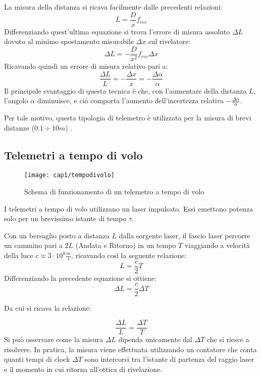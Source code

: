 La misura della distanza si ricava facilmente dalle precedenti relazioni:
\begin{equation}
  L=\frac{D}{x}f_{rec}
\end{equation}
Differenziando quest'ultima equazione si trova l'errore di misura assoluto $\Delta L$ dovuto al minimo spostamento misurabile $\Delta x$ sul rivelatore: 
\begin{equation}
	 \Delta L=-\frac{D}{x^2}f_{rec}\Delta x
\end{equation}
Ricavando quindi un errore di misura relativo pari a:
\begin{equation}
\frac{\Delta L}{L}=-\frac{\Delta x}{x}=-\frac{\Delta\alpha}{\alpha}
\end{equation}
Il principale svantaggio di questa tecnica è che, con l'aumentare della distanza $L$, l'angolo $\alpha$ diminuisce, e ciò comporta l'aumento dell'incertezza relativa $-\frac{\Delta\alpha}{\alpha}$.
 
Per tale motivo, questa tipologia di telemetro è utilizzata per la misura di brevi distanze ($0.1\div 10 m$) .

\subsection{Telemetri a tempo di volo}
\begin{figure}[H]
	\begin{center}
		\texttt{[image: cap1/tempodivolo]}
		\caption{Schema di funzionamento di un telemetro a tempo di volo}
		\label{tempodivolo}
	\end{center}
\end{figure}
I telemetri a tempo di volo utilizzano un laser impulsato. Essi emettono potenza solo per un brevissimo istante di tempo $\tau$.

Con un bersaglio posto a distanza $L$ dalla sorgente laser, il fascio laser percorre un cammino pari a $2L$ (Andata e Ritorno) in un tempo $T$ viaggiando a velocità della luce $c\approx3\cdot10^8\frac{m}{s}$, ricavando così la seguente relazione:
\begin{equation}
  L=\frac{c}{2}T
\end{equation}
Differenziando la precedente equazione si ottiene:
\begin{equation}
  \Delta L=\frac{c}{2}\Delta T
\end{equation}

Da cui si ricava la relazione:

\begin{equation}
  \frac{\Delta L}{L}=\frac{\Delta T}{T}
\end{equation}
Si può osservare come la misura $\Delta L$ dipenda unicamente dal $\Delta T$ che si riesce a risolvere. In pratica, la misura viene effettuata utilizzando un contatore che conta quanti tempi di clock $\Delta T$ sono intercorsi tra l'istante di partenza del raggio laser e il momento in cui ritorna all'ottica di rivelazione.

